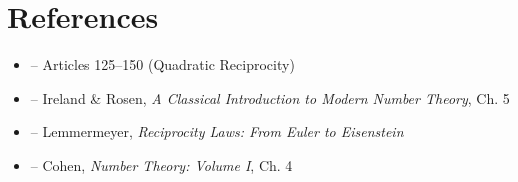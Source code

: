 \section{References}

\begin{itemize}
    \item \cite{gauss-disq} -- Articles 125--150 (Quadratic Reciprocity)
    \item \cite{ireland-rosen} -- Ireland \& Rosen, \textit{A Classical Introduction to Modern Number Theory}, Ch. 5
    \item \cite{lemmermeyer-reciprocity} -- Lemmermeyer, \textit{Reciprocity Laws: From Euler to Eisenstein}
    \item \cite{cohen-number-theory} -- Cohen, \textit{Number Theory: Volume I}, Ch. 4
\end{itemize}